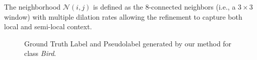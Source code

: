 The neighborhood \( \mathcal{N}(i, j) \) is defined as the 8-connected neighbors (i.e., a \(3\times{3}\) window) with multiple dilation rates  allowing the refinement to capture both local and semi-local context.

\begin{figure}[ht]
    \centering
    \setlength{\tabcolsep}{2pt} %
    \renewcommand{\arraystretch}{0.9}
    \caption{Ground Truth Label and Pseudolabel generated by our method for class \textit{Bird}.}
    \label{fig:pseudolabel_examples}
\end{figure}


